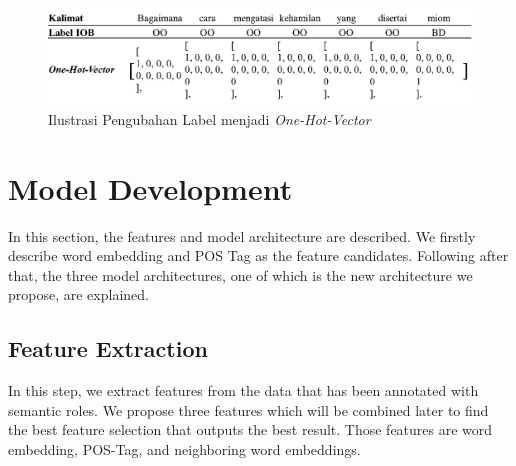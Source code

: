 \begin{figure}
	\centering
	\includegraphics[width=\linewidth]{images/labeltoone}
	\caption{Ilustrasi Pengubahan Label menjadi \textit{One-Hot-Vector}}
	\label{fig:labeltoone}
\end{figure}

\section{Model Development}
In this section, the features and model architecture are described. We firstly describe word embedding and POS Tag as the feature candidates. Following after that, the three model architectures, one of which is the new architecture we propose, are explained.

\subsection{Feature Extraction}
In this step, we extract features from the data that has been annotated with semantic roles. We propose three features which will be combined later to find the best feature selection that outputs the best result. Those features are word embedding, POS-Tag, and neighboring word embeddings.

